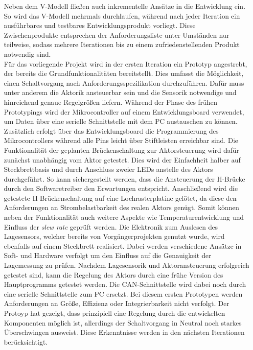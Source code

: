 Neben dem V-Modell fließen auch inkrementelle Ansätze in die Entwicklung ein. So wird das V-Modell mehrmals durchlaufen, während nach jeder Iteration ein ausführbares und testbares Entwicklungsprodukt vorliegt. Diese Zwischenprodukte entsprechen der Anforderungsliste unter Umständen nur teilweise, sodass mehrere Iterationen bis zu einem zufriedenstellenden Produkt notwendig sind.\\
Für das vorliegende Projekt wird in der ersten Iteration ein Prototyp angestrebt, der bereits die Grundfunktionalitäten bereitstellt. Dies umfasst die Möglichkeit, einen Schaltvorgang nach Anforderungsspezifikation durchzuführen. Dafür muss unter anderem die Aktorik ansteuerbar sein und die Sensorik notwendige und hinreichend genaue Regelgrößen liefern. 
Während der Phase des frühen Prototypings wird der Mikrocontroller auf einem Entwicklungsboard verwendet, um Daten über eine serielle Schnittstelle mit dem PC austauschen zu können. Zusätzlich erfolgt über das Entwicklungsboard die Programmierung des Mikrocontrollers während alle Pins leicht über Stiftleisten erreichbar sind. Die Funktionalität der geplanten Brückenschaltung zur Aktorsteuerung wird dafür zunächst unabhängig vom Aktor getestet. Dies wird der Einfachheit halber auf Steckbrettbasis und durch Anschluss zweier LEDs anstelle des Aktors durchgeführt. So kann sichergestellt werden, dass die Ansteuerung der H-Brücke durch den Softwaretreiber den Erwartungen entspricht. Anschließend wird die getestete H-Brückenschaltung auf eine Lochrasterplatine gelötet, da diese den Anforderungen an Strombelastbarkeit des realen Aktors genügt. Somit können neben der Funktionalität auch weitere Aspekte wie Temperaturentwicklung und Einfluss der \textit{slew rate} geprüft werden.
Die Elektronik zum Auslesen des Lagesensors, welcher bereits von Vorgängerprojekten genutzt wurde, wird ebenfalls auf einem Steckbrett realisiert. Dabei werden verschiedene Ansätze in Soft- und Hardware verfolgt um den Einfluss auf die Genauigkeit der Lagemessung zu prüfen.
Nachdem Lagesensorik und Aktoransteuerung erfolgreich getestet sind, kann die Regelung des Aktors durch eine frühe Version des Hauptprogramms getestet werden. Die CAN-Schnittstelle wird dabei noch durch eine serielle Schnittstelle zum PC ersetzt. Bei diesem ersten Prototypen werden Anforderungen an Größe, Effizienz oder Integrierbarkeit nicht verfolgt. Der Protoyp hat gezeigt, dass prinzipiell eine Regelung durch die entwickelten Komponenten möglich ist, allerdings der Schaltvorgang in Neutral noch starkes Überschwingen ausweist. Diese Erkenntnisse werden in den nächsten Iterationen berücksichtigt. 
